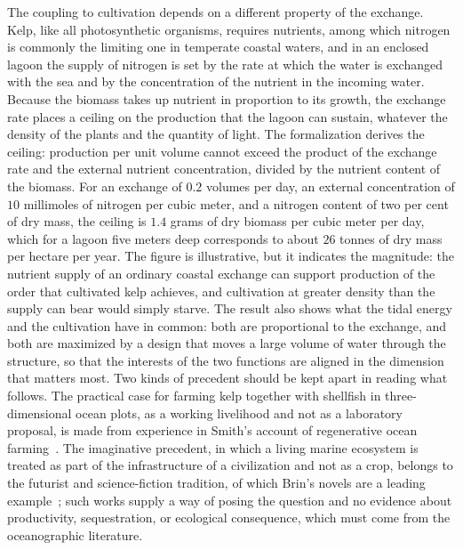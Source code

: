 The coupling to cultivation depends on a different property of the exchange. Kelp, like all photosynthetic organisms, requires nutrients, among which nitrogen is commonly the limiting one in temperate coastal waters, and in an enclosed lagoon the supply of nitrogen is set by the rate at which the water is exchanged with the sea and by the concentration of the nutrient in the incoming water. Because the biomass takes up nutrient in proportion to its growth, the exchange rate places a ceiling on the production that the lagoon can sustain, whatever the density of the plants and the quantity of light. The formalization derives the ceiling: production per unit volume cannot exceed the product of the exchange rate and the external nutrient concentration, divided by the nutrient content of the biomass. For an exchange of $0.2$ volumes per day, an external concentration of $10$ millimoles of nitrogen per cubic meter, and a nitrogen content of two per cent of dry mass, the ceiling is $1.4$ grams of dry biomass per cubic meter per day, which for a lagoon five meters deep corresponds to about $26$ tonnes of dry mass per hectare per year. The figure is illustrative, but it indicates the magnitude: the nutrient supply of an ordinary coastal exchange can support production of the order that cultivated kelp achieves, and cultivation at greater density than the supply can bear would simply starve. The result also shows what the tidal energy and the cultivation have in common: both are proportional to the exchange, and both are maximized by a design that moves a large volume of water through the structure, so that the interests of the two functions are aligned in the dimension that matters most. Two kinds of precedent should be kept apart in reading what follows. The practical case for farming kelp together with shellfish in three-dimensional ocean plots, as a working livelihood and not as a laboratory proposal, is made from experience in Smith's account of regenerative ocean farming~\cite{smith2019}. The imaginative precedent, in which a living marine ecosystem is treated as part of the infrastructure of a civilization and not as a crop, belongs to the futurist and science-fiction tradition, of which Brin's novels are a leading example~\cite{brin1983}; such works supply a way of posing the question and no evidence about productivity, sequestration, or ecological consequence, which must come from the oceanographic literature.

